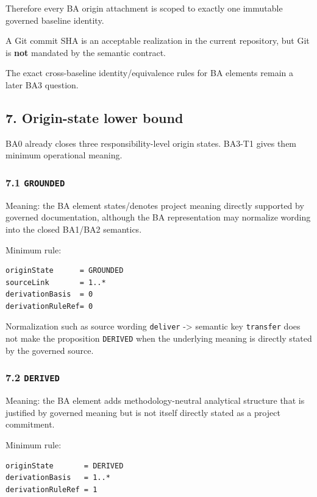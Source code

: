 \documentclass[11pt,a4paper]{article}
\begin{document}
Therefore every BA origin attachment is scoped to exactly one immutable governed baseline identity.

A Git commit SHA is an acceptable realization in the current repository, but Git is \textbf{not} mandated by the semantic contract.

The exact cross-baseline identity/equivalence rules for BA elements remain a later BA3 question.

\subsection{7. Origin-state lower bound}\label{7-origin-state-lower-bound}

BA0 already closes three responsibility-level origin states. BA3-T1 gives them minimum operational meaning.

\subsubsection{\texorpdfstring{7.1 \texttt{GROUNDED}}{7.1 GROUNDED}}\label{71-grounded}

Meaning: the BA element states/denotes project meaning directly supported by governed documentation, although the BA representation may normalize wording into the closed BA1/BA2 semantics.

Minimum rule:

\begin{verbatim}
originState      = GROUNDED
sourceLink       = 1..*
derivationBasis  = 0
derivationRuleRef= 0
\end{verbatim}

Normalization such as source wording \texttt{deliver} -\textgreater{} semantic key \texttt{transfer} does not make the proposition \texttt{DERIVED} when the underlying meaning is directly stated by the governed source.

\subsubsection{\texorpdfstring{7.2 \texttt{DERIVED}}{7.2 DERIVED}}\label{72-derived}

Meaning: the BA element adds methodology-neutral analytical structure that is justified by governed meaning but is not itself directly stated as a project commitment.

Minimum rule:

\begin{verbatim}
originState       = DERIVED
derivationBasis   = 1..*
derivationRuleRef = 1
\end{verbatim}
\end{document}
